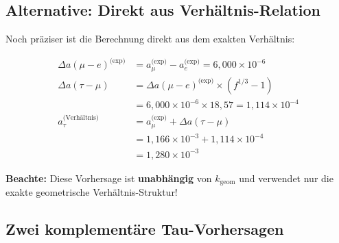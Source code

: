 	\subsection{Alternative: Direkt aus Verhältnis-Relation}
	
	Noch präziser ist die Berechnung direkt aus dem exakten Verhältnis:
	
	\begin{align}
		\Delta a(\mu-e)^{\text{(exp)}} &= a_\mu^{\text{(exp)}} - a_e^{\text{(exp)}} = 6{,}000 \times 10^{-6} \\
		\Delta a(\tau-\mu) &= \Delta a(\mu-e)^{\text{(exp)}} \times (f^{1/3} - 1) \\
		&= 6{,}000 \times 10^{-6} \times 18{,}57 = 1{,}114 \times 10^{-4} \\
		a_\tau^{\text{(Verhältnis)}} &= a_\mu^{\text{(exp)}} + \Delta a(\tau-\mu) \\
		&= 1{,}166 \times 10^{-3} + 1{,}114 \times 10^{-4} \\
		&= \boxed{1{,}280 \times 10^{-3}}
	\end{align}
	
	\textbf{Beachte:} Diese Vorhersage ist \textbf{unabhängig} von $k_{\text{geom}}$ und verwendet nur die exakte geometrische Verhältnis-Struktur!
	
	\subsection{Zwei komplementäre Tau-Vorhersagen}
	
	\begin{table}[h]
		\centering
		\caption{Drei T0-Vorhersagen für $a_\tau$}
	\end{table}
	
